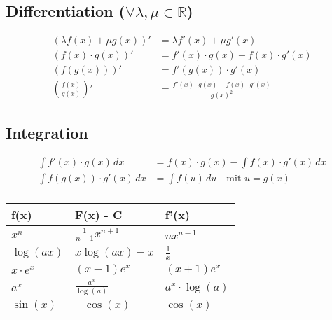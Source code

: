 \begin{mdframed}[style=eqbox]
\subsection{Differentiation ($\forall \lambda, \mu \in \mathbb{R}$)}
\begin{align*}
  (\lambda f(x) + \mu g(x))' &= \lambda f'(x) + \mu g'(x)\\[0.25em]
  (f(x) \cdot g(x))' &= f'(x) \cdot g(x) + f(x) \cdot g'(x)\\[0.25em]
  (f(g(x)))' &= f'(g(x)) \cdot g'(x)\\
  \left(\frac{f(x)}{g(x)}\right)' &= \frac{f'(x) \cdot g(x) - f(x) \cdot g'(x)}{g(x)^2}
\end{align*}
\end{mdframed}

\begin{mdframed}[style=eqbox]
\subsection{Integration}
\begin{align*}
  \int f'(x) \cdot g(x) \,dx &= f(x) \cdot g(x) - \int f(x) \cdot g'(x) \,dx\\[0.25em]
  \int f(g(x)) \cdot g'(x) \,dx &= \int f(u) \,du \quad \text{mit } u = g(x)\\[0.25em]
\end{align*}
\end{mdframed}

\begin{mdframed}[style=bluebox]
\begin{tabularx}{\textwidth}{XXX}
  \hline
  f(x) & F(x) - C & f'(x)\\
  \hline
  $x^n$ & $\frac{1}{n+1}x^{n+1}$ & $nx^{n-1}$\\
  $\log(ax)$ & $x\log(ax) - x$ & $\frac{1}{x}$\\
  $x \cdot e^x$ & $(x-1)e^x$ & $(x+1)e^x$\\
  $a^x$ & $\frac{a^x}{\log(a)}$ & $a^x \cdot \log(a)$\\
  $\sin(x)$ & $-\cos(x)$ & $\cos(x)$\\

  \hline
\end{tabularx}
\end{mdframed}

